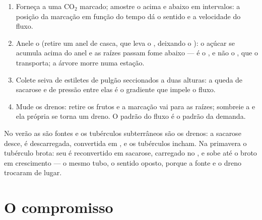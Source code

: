 \begin{method}\label{met:b1:plant-transport:translocation}
\begin{enumerate}
  \item Forneça a uma  $\mathrm{CO_2}$ marcado; amostre o 
        acima e abaixo em intervalos: a posição da marcação em função
        do tempo dá o sentido e a velocidade do fluxo.
  \item Anele o  (retire um anel de casca, que leva o ,
        deixando o ): o açúcar se acumula acima do anel e as
        raízes passam fome abaixo --- é o , e não o , que o
        transporta; a árvore morre numa estação.
  \item Colete seiva de estiletes de pulgão seccionados a duas
        alturas: a queda de sacarose e de pressão entre elas é o
        gradiente que impele o fluxo.
  \item Mude os drenos: retire os frutos e a marcação vai para as
        raízes; sombreie a  e ela própria se torna um dreno. O
        padrão do fluxo é o padrão da demanda.
\end{enumerate}
\end{method}

\begin{example}\label{ex:b1:plant-transport:potato}
No verão as  são fontes e os tubérculos subterrâneos são os
drenos: a sacarose desce, é descarregada, convertida em , e os
tubérculos incham. Na primavera o tubérculo brota: seu  é
reconvertido em sacarose, carregado no , e sobe até o broto em
crescimento --- o mesmo tubo, o sentido oposto, porque a fonte e o
dreno trocaram de lugar.
\end{example}

\section{O compromisso}

